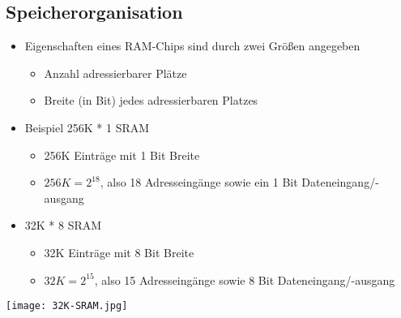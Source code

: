 	\subsection{Speicherorganisation}
		\begin{itemize}
			\item Eigenschaften eines RAM-Chips sind durch zwei Grö\ss en angegeben
				\begin{itemize}
					\item Anzahl adressierbarer Plätze
					\item Breite (in Bit) jedes adressierbaren Platzes
				\end{itemize}
			\item Beispiel 256K * 1 SRAM
				\begin{itemize}
					\item 256K Einträge mit 1 Bit Breite
					\item $256K = 2^{18}$, also 18 Adresseingänge sowie ein 1 Bit Dateneingang/-ausgang
				\end{itemize}
			\end{itemize}
			\begin{minipage}{0.5\textwidth}
				\begin{itemize}
					\item 32K * 8 SRAM
						\begin{itemize}
							\item 32K Einträge mit 8 Bit Breite
							\item $32K = 2^{15}$, also 15 Adresseingänge sowie 8 Bit Dateneingang/-ausgang
						\end{itemize}
			\end{itemize}
		\end{minipage}
		\begin{minipage}{0.45\textwidth}
			\centerline{\texttt{[image: 32K-SRAM.jpg]}}
		\end{minipage}


